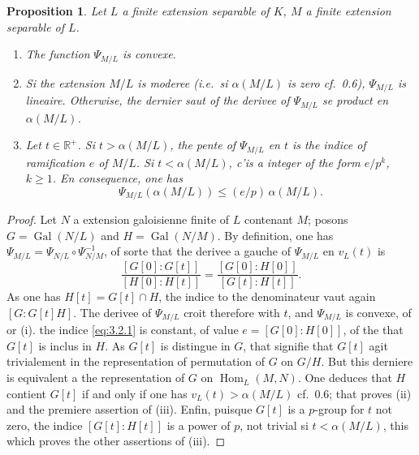 \documentclass[12pt,a4paper]{article}
\theoremstyle{plain}
\newtheorem{proposition}[theorem]{Proposition}
\theoremstyle{definition}
\theoremstyle{remark}
\DeclareMathOperator{\Hom}{Hom}
\newcommand{\bR}{\mathbb{R}}
\providecommand{\Hom}{\operatorname{Hom}}
\providecommand{\Gal}{\operatorname{Gal}}
\begin{document}
\begin{proposition}\label{prop:3.2}
Let $L$ a finite extension separable of $K$, $M$ a finite extension separable of $L$.
\begin{enumerate}[label=(\roman*)]
\item The function $\Psi_{M/L}$ is convexe.
\item Si the extension $M/L$ is moderee (i.e.~si $\alpha(M/L)$ is zero cf.~0.6), $\Psi_{M/L}$ is lineaire. Otherwise, the dernier saut of the derivee of $\Psi_{M/L}$ se product en $\alpha(M/L)$.
\item Let $t \in \bR^+$. Si $t > \alpha(M/L)$, the pente of $\Psi_{M/L}$ en $t$ is the indice of ramification $e$ of $M/L$. Si $t < \alpha(M/L)$, c'is a integer of the form $e/p^k$, $k \geq 1$. En consequence, one has
\[
\Psi_{M/L}(\alpha(M/L)) \leq (e/p) \, \alpha(M/L).
\]
\end{enumerate}
\end{proposition}

\begin{proof}
Let $N$ a extension galoisienne finite of $L$ contenant $M$; posons $G = \Gal(N/L)$ and $H = \Gal(N/M)$. By definition, one has $\Psi_{M/L} = \Psi_{N/L} \circ \Psi_{N/M}^{-1}$, of sorte that the derivee a gauche of $\Psi_{M/L}$ en $v_L(t)$ is
\begin{equation}\label{eq:3.2.1}
\frac{[G[0]:G[t]]}{[H[0]:H[t]]} = \frac{[G[0]:H[0]]}{[G[t]:H[t]]}.
\end{equation}
As one has $H[t] = G[t] \cap H$, the indice to the denominateur vaut again $[G:G[t]H]$. The derivee of $\Psi_{M/L}$ croit therefore with $t$, and $\Psi_{M/L}$ is convexe, of or (i). the indice \eqref{eq:3.2.1} is constant, of value $e = [G[0]:H[0]]$, of the that $G[t]$ is inclus in $H$. As $G[t]$ is distingue in $G$, that signifie that $G[t]$ agit trivialement in the representation of permutation of $G$ on $G/H$. But this derniere is equivalent a the representation of $G$ on $\Hom_L(M, N)$. One deduces that $H$ contient $G[t]$ if and only if one has $v_L(t) > \alpha(M/L)$ cf.~0.6; that proves (ii) and the premiere assertion of (iii). Enfin, puisque $G[t]$ is a $p$-group for $t$ not zero, the indice $[G[t]:H[t]]$ is a power of $p$, not trivial si $t < \alpha(M/L)$, this which proves the other assertions of (iii).
\end{proof}

\subsection{}
\label{sec:3.3}
\end{document}
